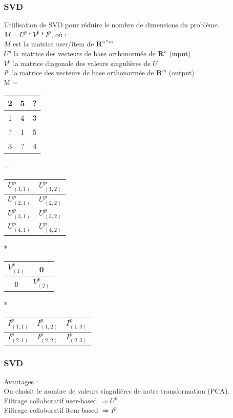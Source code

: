 \begin{frame}
  \frametitle{SVD}
  Utiilisation de SVD pour réduire le nombre de dimensions du problème.
  $M = U^p*V^p*I^p$,  où : \\
  $M$ est la matrice user/item de $\mathbf{R}^{n*m}$ \\
  $U^p$ la matrice des vecteurs de base orthonormée de $\mathbf{R}^{n}$ (input) \\
  $V^p$ la matrice diagonale des valeurs singulières de $U$ \\
  $I^p$ la matrice des vecteurs de base orthonormée de $\mathbf{R}^{m}$ (output) \\
  M = 
  \begin{tabular}{|c|c|c|}
    \hline
    2 & 5 & ? \\
    \hline
    1 & 4 & 3 \\
    \hline
    ? & 1 & 5 \\
    \hline
    3 & ? & 4 \\
    \hline
  \end{tabular}
  =
  \begin{center}
  \begin{tabular}{|c|c|}
    \hline
    $U^p_{(1,1)}$ & $U^p_{(1,2)}$  \\
    \hline
    $U^p_{(2,1)}$ & $U^p_{(2,2)}$  \\
    \hline
    $U^p_{(3,1)}$ & $U^p_{(3,2)}$  \\
    \hline
    $U^p_{(4,1)}$ & $U^p_{(4,2)}$  \\
    \hline
  \end{tabular}
  *
  \begin{tabular}{|c|c|}
    \hline
    $V^p_{(1)}$ & 0  \\
    \hline
    0 & $V^p_{(2)}$  \\
    \hline
  \end{tabular}
  *
  \begin{tabular}{|c|c|c|}
    \hline
    $I^p_{(1,1)}$ & $I^p_{(1,2)}$ & $I^p_{(1,3)}$  \\
    \hline
    $I^p_{(2,1)}$ & $I^p_{(2,2)}$ & $I^p_{(2,3)}$  \\
    \hline
  \end{tabular}
  \end{center}
\end{frame}

\begin{frame}
  \frametitle{SVD}
  Avantages : \\
  On choisit le nombre de valeurs singulières de notre transformation (PCA). \\
  Filtrage collaboratif user-based $\Rightarrow U^p$\\
  Filtrage collaboratif item-based $\Rightarrow I^p$
\end{frame}

